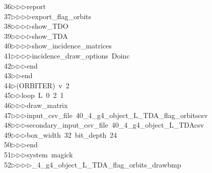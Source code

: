 \begin{tabbing}
36\>$\triangleright$\>$\triangleright$\>$\triangleright$\>report\ \\[0pt]
37\>$\triangleright$\>$\triangleright$\>$\triangleright$\>$\triangleright$\>export\_flag\_orbits\ \\[0pt]
38\>$\triangleright$\>$\triangleright$\>$\triangleright$\>$\triangleright$\>show\_TDO\ \\[0pt]
39\>$\triangleright$\>$\triangleright$\>$\triangleright$\>$\triangleright$\>show\_TDA\ \\[0pt]
40\>$\triangleright$\>$\triangleright$\>$\triangleright$\>$\triangleright$\>show\_incidence\_matrices\ \\[0pt]
41\>$\triangleright$\>$\triangleright$\>$\triangleright$\>$\triangleright$\>incidence\_draw\_options\ Doinc\ \\[0pt]
42\>$\triangleright$\>$\triangleright$\>$\triangleright$\>end\ \\[0pt]
43\>$\triangleright$\>$\triangleright$\>end\\[0pt]
44\>$\triangleright$\>(ORBITER)\ v\ 2\ \\[0pt]
45\>$\triangleright$\>$\triangleright$\>loop\ L\ 0\ 2\ 1\ \\[0pt]
46\>$\triangleright$\>$\triangleright$\>$\triangleright$\>draw\_matrix\ \\[0pt]
47\>$\triangleright$\>$\triangleright$\>$\triangleright$\>input\_csv\_file\ 40\_4\_g4\_object\_L\_TDA\_flag\_orbitscsv\ \\[0pt]
48\>$\triangleright$\>$\triangleright$\>$\triangleright$\>secondary\_input\_csv\_file\ 40\_4\_g4\_object\_L\_TDAcsv\ \\[0pt]
49\>$\triangleright$\>$\triangleright$\>$\triangleright$\>box\_width\ 32\ bit\_depth\ 24\ \\[0pt]
50\>$\triangleright$\>$\triangleright$\>$\triangleright$\>end\ \\[0pt]
51\>$\triangleright$\>$\triangleright$\>$\triangleright$\>system\ magick\ \\[0pt]
52\>$\triangleright$\>$\triangleright$\>$\triangleright$\>$\triangleright$\_4\_g4\_object\_L\_TDA\_flag\_orbits\_drawbmp\ \\[0pt]

\end{tabbing}
